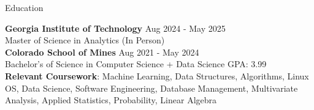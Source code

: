 \documentclass{resume} %
\begin{document}
\vspace{-10pt}

\begin{rSection}{Education}

{\bf Georgia Institute of Technology} \hfill {Aug 2024 - May 2025}\\
Master of Science in Analytics (In Person) \\
{\bf Colorado School of Mines} \hfill {Aug 2021 - May 2024}\\
Bachelor's of Science in Computer Science + Data Science \hfill {GPA: 3.99}\\
\textbf{Relevant Coursework}: Machine Learning, Data Structures, Algorithms, Linux OS, Data Science, Software Engineering, Database Management, Multivariate Analysis, Applied Statistics, Probability, Linear Algebra



\end{rSection}
\vspace{-6pt}
\end{document}
